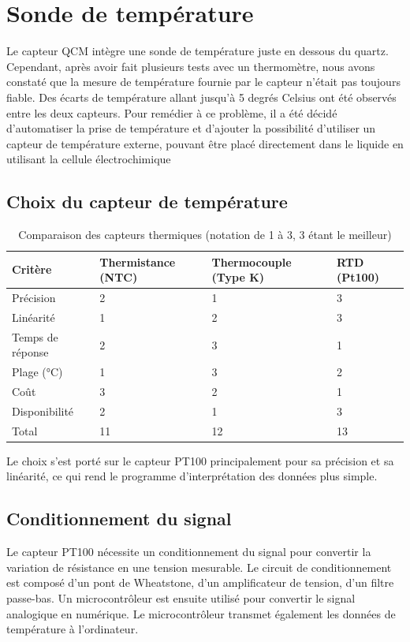 \chapter{Sonde de température}
\label{chap:temperature_sensor}
Le capteur QCM intègre une sonde de température juste en dessous du quartz. Cependant, après avoir fait plusieurs tests avec un thermomètre, nous avons constaté que la mesure de température fournie par le capteur n'était pas toujours fiable. Des écarts de température allant jusqu'à 5 degrés Celsius ont été observés entre les deux capteurs.
Pour remédier à ce problème, il a été décidé d’automatiser la prise de température et d’ajouter la possibilité d’utiliser un capteur de température externe, pouvant être placé directement dans le liquide en utilisant la cellule électrochimique

\section{Choix du capteur de température}

\begin{table}[H]
\centering
\begin{tabularx}{\textwidth}{|l|X|X|X|}
\hline
\textbf{Critère}      & \textbf{Thermistance (NTC)} & \textbf{Thermocouple (Type K)} & \textbf{RTD (Pt100)} \\
\hline
Précision             & 2 & 1 & 3 \\
Linéarité             & 1 & 2 & 3 \\
Temps de réponse      & 2 & 3 & 1 \\
Plage (°C)            & 1 & 3 & 2 \\
Coût                  & 3 & 2 & 1 \\
Disponibilité         & 2 & 1 & 3 \\
\hline
Total                 & 11 & 12 & 13 \\
\hline
\end{tabularx}
\caption{Comparaison des capteurs thermiques (notation de 1 à 3, 3 étant le meilleur)}
\end{table}

Le choix s'est porté sur le capteur PT100 principalement pour sa précision et sa linéarité, ce qui rend le programme d'interprétation des données plus simple.

\section{Conditionnement du signal}
Le capteur PT100 nécessite un conditionnement du signal pour convertir la variation de résistance en une tension mesurable.
Le circuit de conditionnement est composé d'un pont de Wheatstone, d'un amplificateur de tension, d'un filtre passe-bas. Un microcontrôleur est ensuite utilisé pour convertir le signal analogique en numérique. Le microcontrôleur transmet également les données de température à l'ordinateur.

